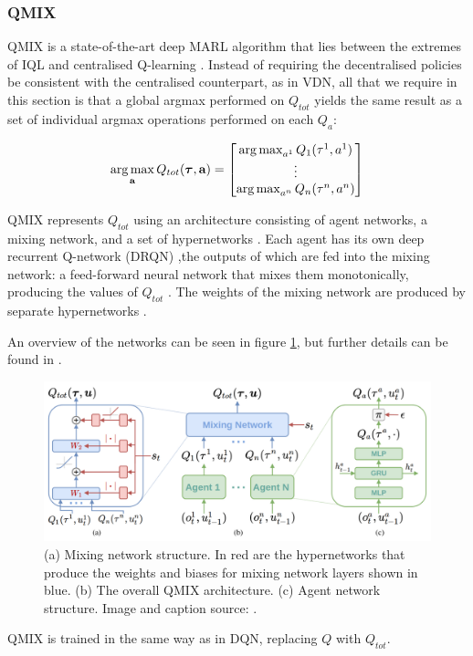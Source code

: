 \subsubsection{QMIX}
QMIX is a state-of-the-art deep MARL algorithm that lies between the extremes of IQL and centralised Q-learning \cite{qmixcite}. Instead of requiring the decentralised policies be consistent with the centralised counterpart, as in VDN, all that we require in this section is that a global argmax performed on $Q_{tot}$ yields
the same result as a set of individual argmax operations
performed on each $Q_a$:

\[\operatorname*{arg\,max}_{\textbf{a}}Q_{tot}(\boldsymbol{\tau},\textbf{a}) = \begin{bmatrix}
        \operatorname*{arg\,max}_{a^1}Q_1(\tau^1,a^1) \\
        \vdots\\
        \operatorname*{arg\,max}_{a^n}Q_n(\tau^n,a^n)
    \end{bmatrix}\]







QMIX represents $Q_{tot}$ using an architecture
consisting of agent networks, a mixing network, and a set
of hypernetworks \cite{hypernetworks} \cite{qmixcite}. Each agent has its own deep recurrent Q-network (DRQN) \cite{dqrn},the outputs of which are fed into the mixing network: a feed-forward neural network that mixes them
monotonically, producing the values of $Q_{tot}$ \cite{qmixcite}. The weights of the mixing network are produced by separate hypernetworks \cite{qmixcite}.

An overview of the networks can be seen in figure \ref{fig:qmix}, but further details can be found in \cite{qmixcite}.

\begin{figure}
    \centering
    \hbox{\hspace{-2.5em}\includegraphics[scale = 0.18]{images/qmix.png}}
    \caption{(a) Mixing network structure. In red are the hypernetworks that produce the weights and biases for mixing network layers shown
in blue. (b) The overall QMIX architecture. (c) Agent network structure. Image and caption source: \cite{qmixcite}.}
    \label{fig:qmix}
\end{figure}





QMIX is trained in the same way as in DQN, replacing $Q$ with $Q_{tot}$.

